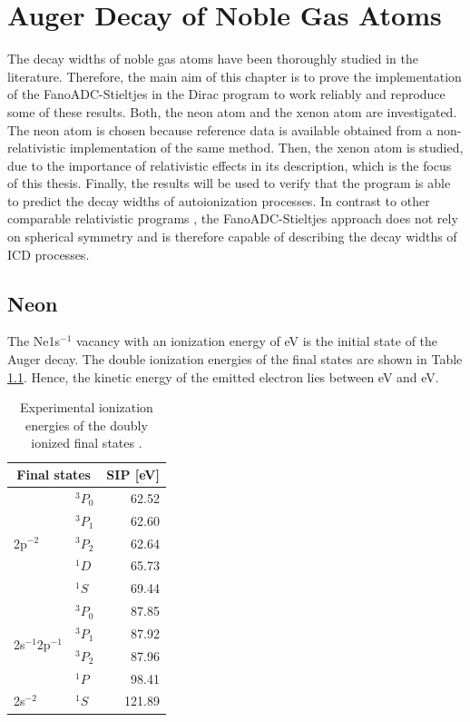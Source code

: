 \chapter{Auger Decay of Noble Gas Atoms}
\label{chapter:res_auger}
The decay widths of noble gas atoms have been thoroughly studied in the
literature. Therefore, the main aim of this chapter is to prove the implementation
of the FanoADC-Stieltjes in the Dirac program \cite{DIRAC13} to work
reliably and reproduce some of these results. Both, the neon atom
and the xenon atom are investigated.
The neon atom is chosen because reference data is available
obtained from a non-relativistic
implementation of the same method. Then, the xenon atom is studied, due
to the importance of relativistic effects in its description, which is
the focus of this thesis.
Finally, the results will be used to verify that the program is
able to predict the decay widths of autoionization processes.
In contrast to other comparable relativistic programs
\cite{Tulkki92,Fritzsche12}, the FanoADC-Stieltjes approach does not
rely on spherical symmetry and is therefore capable of describing
the decay widths of \ac{ICD} processes.


\section{Neon}

The Ne1s$^{-1}$ vacancy with an ionization energy of \unit[870]{eV}
\cite{Saethre84} is
the initial state of the Auger decay. The double ionization energies of
the final states are shown in Table \ref{table:Ne_dips}. Hence, the
kinetic energy of the emitted electron lies between
\unit[748]{eV} and \unit[808]{eV}.

\begin{table}[h]
  \centering
  \caption{Experimental ionization energies of the doubly ionized final states
           \cite{NIST2014}.}
  \begin{tabular}{llr}
   \toprule
   \multicolumn{2}{c}{Final states} & \acs{SIP} [eV]\\
   \midrule
   \multirow{5}{*}{2p$^{-2}$} & $^3P_0$        & 62.52 \\
                              & $^3P_1$        & 62.60 \\
                              & $^3P_2$        & 62.64 \\
                              & $^1D$          & 65.73 \\
                              & $^1S$          & 69.44 \\
   \midrule
 \multirow{4}{*}{2s$^{-1}$2p$^{-1}$} & $^3P_0$ & 87.85 \\
                              & $^3P_1$        & 87.92 \\
                              & $^3P_2$        & 87.96 \\
                              & $^1P$          & 98.41 \\
   \midrule                                    
      2s$^{-2}$               & $^1S$          &121.89 \\
   \bottomrule
  \end{tabular}
  \label{table:Ne_dips}
\end{table}

